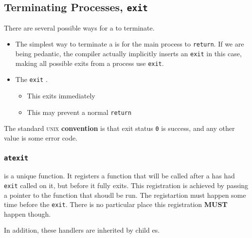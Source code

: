 \subsection{Terminating Processes, \texttt{exit}}\label{subsec:Terminating_Processes-exit}
There are several possible ways for a  to terminate.

\begin{itemize}[noitemsep]
\item The simplest way to terminate a  is for the main process to \texttt{return}.
  If we are being pedantic, the compiler actually implicitly inserts an \texttt{exit} in this case, making all possible exits from a process use \texttt{exit}.

\item The \texttt{exit} .
  \begin{itemize}[noitemsep]
  \item This exits immediately
  \item This may prevent a normal \texttt{return}
  \end{itemize}
\end{itemize}

The standard \textsc{unix} \textbf{convention} is that exit status \texttt{0} is success, and any other value is some error code.

\subsubsection{\texttt{atexit}}\label{subsubsec:atexit}
 is a unique function.
It registers a function that will be called after a  has had \texttt{exit} called on it, but before it fully exits.
This registration is achieved by passing a pointer to the function that shoudl be run.
The registartion must happen some time before the \texttt{exit}.
There is no particular place this registration \textbf{MUST} happen though.

In addition, these handlers are inherited by child es.


